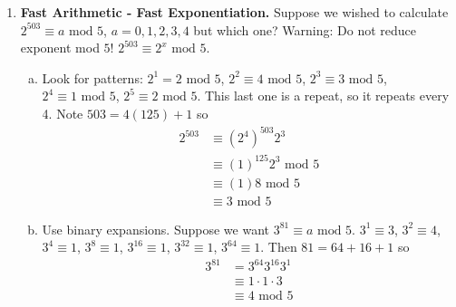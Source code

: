 \documentclass[class=article, crop=false]{standalone}
\begin{document}
\begin{enumerate}[1.]
	\item \textbf{Fast Arithmetic - Fast Exponentiation.} Suppose we wished to calculate $2^{503}\equiv a\mbox{ mod }5$,
	$a=0,1,2,3,4$ but which one? 
	{\color{red} Warning:} Do not reduce exponent mod $5$! $2^{503}\equiv 2^x \mbox{ mod }5$.
	\begin{enumerate}[(a)]
		\item Look for patterns: $2^1 = 2\mbox{ mod }5$, $2^2\equiv 4\mbox{ mod }5$, $2^3\equiv 3\mbox{ mod }5$,
		$2^4\equiv 1\mbox{ mod }5$, $2^5\equiv 2\mbox{ mod }5$. This last one is a repeat, so it repeats
		every 4. Note $503=4(125)+1$ so 
		\begin{align*}
			2^{503} &\equiv(2^4)^{503}2^3\\
			&\equiv (1)^{125} 2^3\mbox{ mod }5\\
			&\equiv (1) 8 \mbox{ mod }5\\
			&\equiv 3\mbox{ mod }5
		\end{align*}
		\item Use binary expansions. Suppose we want $3^{81}\equiv a\mbox{ mod }5$.
		$3^1\equiv 3$, $3^2\equiv 4$, $3^4\equiv 1$, $3^8\equiv 1$, $3^{16}\equiv 1$,
		$3^{32}\equiv 1$, $3^{64}\equiv 1$. Then $81=64+16+1$ so 
		\begin{align*}
			3^{81}&=3^{64}3^{16}3^1 \\
			&\equiv 1\cdot 1\cdot 3 \\
			&\equiv 4\mbox{ mod }5
		\end{align*}
	\end{enumerate}
\end{enumerate}

\end{document}

